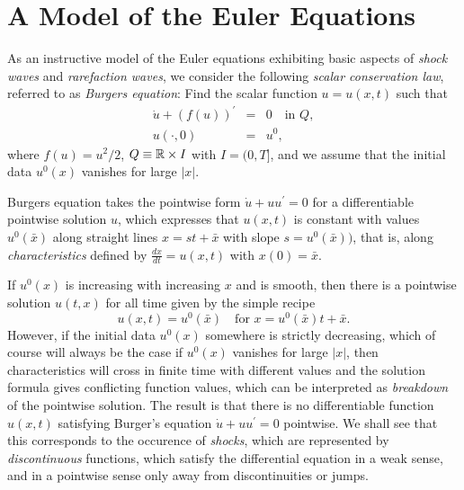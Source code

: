 
\normalsize

\section{A Model of the Euler Equations}

As an instructive model of the 
Euler equations exhibiting basic aspects of
\emph{shock waves} and \emph{rarefaction waves}, 
we consider the following \emph{scalar conservation law}, referred to
as \emph{Burgers equation}:
Find the scalar function $u=u(x,t)$ such that
\begin{equation}\label{burgers}
\begin{array}{rcl}
\dot u +(f(u))^\prime &=&  0\quad\mbox{in }Q, \\
u(\cdot ,0)  &=&  u^0,
\end{array}
\end{equation}
where $f(u)=u^2/2$, $Q\equiv {\mathbb{R}}\times I$ with $I=(0,T]$,  
and we assume that the initial data 
$u^0(x)$ vanishes for large $\vert x\vert$.
 
Burgers equation takes the pointwise form 
$\dot u+uu^\prime=0$ for a differentiable  pointwise solution $u$, which  
expresses that $u(x,t)$ is constant with values $u^0(\bar x)$
along straight lines $x=st+\bar x$ with slope $s=u^0(\bar x))$,
that is, along \emph{characteristics} defined by $\frac{dx}{dt}=u(x,t)$
with $x(0)=\bar x$. 

If $u^0(x)$ is increasing with increasing $x$ and is smooth, 
then there is a pointwise solution $u(t,x)$ for all time given by
the simple recipe 
\begin{equation}\label{uxu0}
u(x,t)=u^0(\bar x)\quad\mbox{for }
x=u^0(\bar x)t+\bar x.
\end{equation}
However, if the initial data $u^0(x)$ somewhere is
strictly decreasing, which of course will always be the case if 
$u^0(x)$ vanishes for large $\vert x\vert$, then characteristics will 
cross in finite time with different values and the solution 
formula gives conflicting function values, which can be 
interpreted as \emph{breakdown} of the pointwise solution. 
The result is 
that there is no differentiable function $u(x,t)$ satisfying
Burger's equation $\dot u+uu^\prime =0$ pointwise. 
We shall see
that this corresponds to the occurence of \emph{shocks}, 
which are represented by \emph{discontinuous} functions,
which satisfy the differential equation in a weak sense,
and in a pointwise sense only away from discontinuities
or jumps. 



